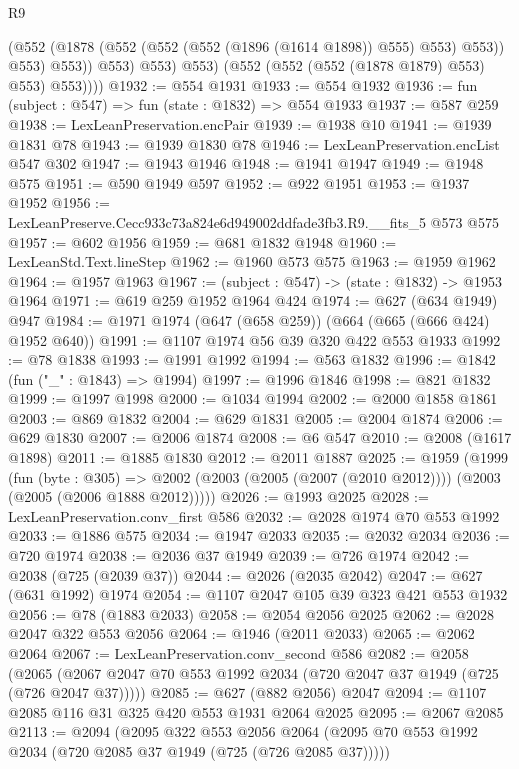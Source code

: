\begin{lexlean}{R9}
\begin{coremodule}
                    (@552 (@1878 (@552 (@552 (@552 (@1896 (@1614 @1898)) @555) @553) @553)) @553)
                    @553))
                @553)
              @553)
            @553)
          (@552 (@552 (@552 (@1878 @1879) @553) @553) @553))))
@1932 := @554 @1931
@1933 := @554 @1932
@1936 := fun (subject : @547) => fun (state : @1832) => @554 @1933
@1937 := @587 @259
@1938 := LexLeanPreservation.encPair
@1939 := @1938 @10
@1941 := @1939 @1831 @78
@1943 := @1939 @1830 @78
@1946 := LexLeanPreservation.encList @547 @302
@1947 := @1943 @1946
@1948 := @1941 @1947
@1949 := @1948 @575
@1951 := @590 @1949 @597
@1952 := @922 @1951
@1953 := @1937 @1952
@1956 := LexLeanPreserve.Cecc933c73a824e6d949002ddfade3fb3.R9.__fits_5 @573 @575
@1957 := @602 @1956
@1959 := @681 @1832 @1948
@1960 := LexLeanStd.Text.lineStep
@1962 := @1960 @573 @575
@1963 := @1959 @1962
@1964 := @1957 @1963
@1967 := (subject : @547) -> (state : @1832) -> @1953 @1964
@1971 := @619 @259 @1952 @1964 @424
@1974 := @627 (@634 @1949) @947
@1984 := @1971 @1974 (@647 (@658 @259)) (@664 (@665 (@666 @424) @1952 @640))
@1991 := @1107 @1974 @56 @39 @320 @422 @553 @1933
@1992 := @78 @1838
@1993 := @1991 @1992
@1994 := @563 @1832
@1996 := @1842 (fun ("_" : @1843) => @1994)
@1997 := @1996 @1846
@1998 := @821 @1832
@1999 := @1997 @1998
@2000 := @1034 @1994
@2002 := @2000 @1858 @1861
@2003 := @869 @1832
@2004 := @629 @1831
@2005 := @2004 @1874
@2006 := @629 @1830
@2007 := @2006 @1874
@2008 := @6 @547
@2010 := @2008 (@1617 @1898)
@2011 := @1885 @1830
@2012 := @2011 @1887
@2025 := @1959
    (@1999
      (fun (byte : @305) =>
      @2002 (@2003 (@2005 (@2007 (@2010 @2012)))) (@2003 (@2005 (@2006 @1888 @2012)))))
@2026 := @1993 @2025
@2028 := LexLeanPreservation.conv_first @586
@2032 := @2028 @1974 @70 @553 @1992
@2033 := @1886 @575
@2034 := @1947 @2033
@2035 := @2032 @2034
@2036 := @720 @1974
@2038 := @2036 @37 @1949
@2039 := @726 @1974
@2042 := @2038 (@725 (@2039 @37))
@2044 := @2026 (@2035 @2042)
@2047 := @627 (@631 @1992) @1974
@2054 := @1107 @2047 @105 @39 @323 @421 @553 @1932
@2056 := @78 (@1883 @2033)
@2058 := @2054 @2056 @2025
@2062 := @2028 @2047 @322 @553 @2056
@2064 := @1946 (@2011 @2033)
@2065 := @2062 @2064
@2067 := LexLeanPreservation.conv_second @586
@2082 := @2058
    (@2065 (@2067 @2047 @70 @553 @1992 @2034 (@720 @2047 @37 @1949 (@725 (@726 @2047 @37)))))
@2085 := @627 (@882 @2056) @2047
@2094 := @1107 @2085 @116 @31 @325 @420 @553 @1931 @2064 @2025
@2095 := @2067 @2085
@2113 := @2094
    (@2095
      @322
      @553
      @2056
      @2064
      (@2095 @70 @553 @1992 @2034 (@720 @2085 @37 @1949 (@725 (@726 @2085 @37)))))

\end{coremodule}
\end{lexlean}
